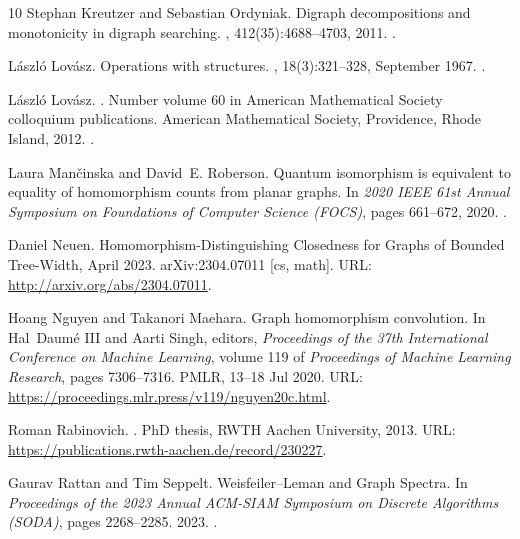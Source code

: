 \documentclass[10pt,a4paper]{article}
\begin{document}
\begin{thebibliography}{10}
Stephan Kreutzer and Sebastian Ordyniak.
\newblock Digraph decompositions and monotonicity in digraph searching.
, 412(35):4688--4703, 2011.
\newblock \href {https://doi.org/10.1016/j.tcs.2011.05.003}
  {}.

L{\'a}szl{\'o} Lov{\'a}sz.
\newblock Operations with structures.
,
  18(3):321--328, September 1967.
\newblock \href {https://doi.org/10.1007/BF02280291}
  {}.

László Lovász.
.
\newblock Number volume 60 in American {Mathematical} {Society} colloquium
  publications. American Mathematical Society, Providence, Rhode Island, 2012.
\newblock \href {https://doi.org/10.1090/coll/060}
  {}.

Laura Man{\v c}inska and David~E. Roberson.
\newblock Quantum isomorphism is equivalent to equality of homomorphism counts
  from planar graphs.
\newblock In {\em 2020 {IEEE} 61st {Annual} {Symposium} on {Foundations} of
  {Computer} {Science} ({FOCS})}, pages 661--672, 2020.
\newblock \href {https://doi.org/10.1109/FOCS46700.2020.00067}
  {}.

Daniel Neuen.
\newblock Homomorphism-{Distinguishing} {Closedness} for {Graphs} of {Bounded}
  {Tree}-{Width}, April 2023.
\newblock arXiv:2304.07011 [cs, math].
\newblock URL: \url{http://arxiv.org/abs/2304.07011}.

Hoang Nguyen and Takanori Maehara.
\newblock Graph homomorphism convolution.
\newblock In Hal~Daumé III and Aarti Singh, editors, {\em Proceedings of the
  37th International Conference on Machine Learning}, volume 119 of {\em
  Proceedings of Machine Learning Research}, pages 7306--7316. PMLR, 13--18 Jul
  2020.
\newblock URL: \url{https://proceedings.mlr.press/v119/nguyen20c.html}.

Roman Rabinovich.
.
\newblock PhD thesis, {RWTH} Aachen University, 2013.
\newblock URL: \url{https://publications.rwth-aachen.de/record/230227}.

Gaurav Rattan and Tim Seppelt.
\newblock Weisfeiler--{Leman} and {Graph} {Spectra}.
\newblock In {\em Proceedings of the 2023 {Annual} {ACM}-{SIAM} {Symposium} on
  {Discrete} {Algorithms} ({SODA})}, pages 2268--2285. 2023.
\newblock \href {https://doi.org/10.1137/1.9781611977554.ch87}
  {}.


\end{thebibliography}
\end{document}

